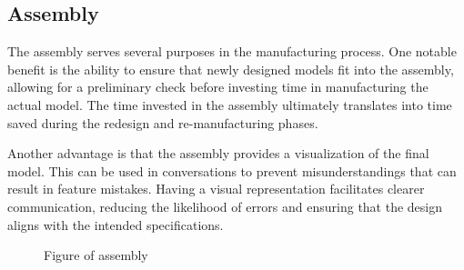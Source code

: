 \documentclass[../report.tex]{subfiles}
\begin{document}
\subsection{Assembly}
    The assembly serves several purposes in the manufacturing process. One
    notable benefit is the ability to ensure that newly designed models fit
    into the assembly, allowing for a preliminary check before investing time
    in manufacturing the actual model. The time invested in the assembly
    ultimately translates into time saved during the redesign and
    re-manufacturing phases.

    Another advantage is that the assembly provides a visualization of the
    final model. This can be used in conversations to prevent misunderstandings
    that can result in feature mistakes. Having a visual representation
    facilitates clearer communication, reducing the likelihood of errors and
    ensuring that the design aligns with the intended specifications.

    \begin{figure}
        \centering
        \caption{Figure of assembly}
    \end{figure}
\end{document}
